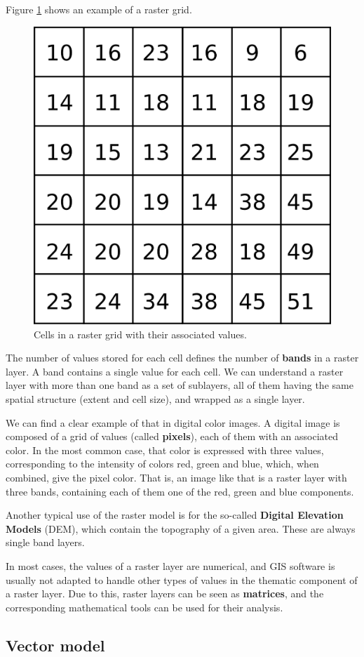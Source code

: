 Figure \ref{Fig:Raster_closeup} shows an example of a raster grid.

\begin{figure}[!hbt]   
\centering
\includegraphics[width=.4\textwidth]{Data/Raster_closeup.png}
\caption{\small Cells in a raster grid with their associated values.}
\label{Fig:Raster_closeup} 
\end{figure}

The number of values stored for each cell defines the number of \textbf{bands} in a raster layer. A band contains a single value for each cell. We can understand a raster layer with more than one band as a set of sublayers, all of them having the same spatial structure (extent and cell size), and wrapped as a single layer.

We can find a clear example of that in digital color images. A digital image is composed of a grid of values (called \textbf{pixels}), each of them with an associated color. In the most common case, that color is expressed with three values, corresponding to the intensity of colors red, green and blue, which, when combined, give the pixel color. That is, an image like that is a raster layer with three bands, containing each of them one of the red, green and blue components.

Another typical use of the raster model is for the so-called \textbf{Digital Elevation Models} (DEM), which contain the topography of a given area. These are always single band layers.

In most cases, the values of a raster layer are numerical, and GIS software is usually not adapted to handle other types of values in the thematic component of a raster layer. Due to this, raster layers can be seen as \textbf{matrices}, and the corresponding mathematical tools can be used for their analysis.


\subsection{Vector model}


